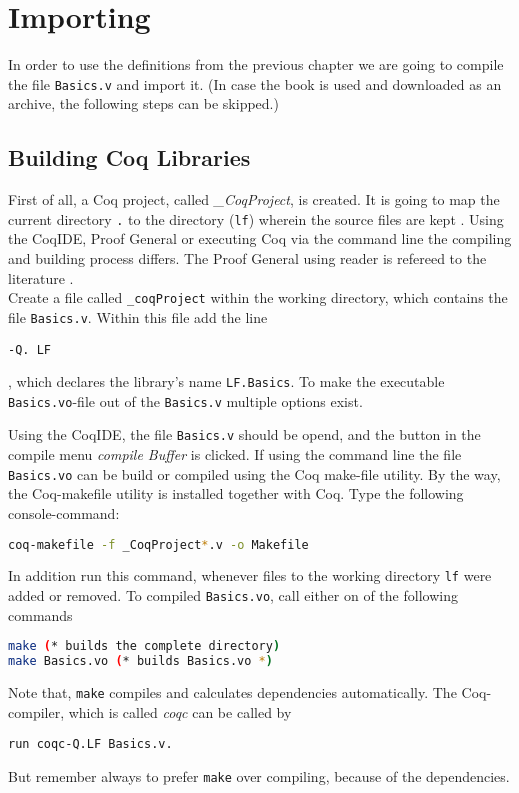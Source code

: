 \section{Importing}


In order to use the definitions from the previous chapter we are going to compile the file 
\texttt{Basics.v} and import it.
(In case the book \cite{PACGGHSY} is used and downloaded as an archive, the following steps can be skipped.)   

\subsection{Building Coq Libraries}

First of all, a Coq project, called {\itshape \_CoqProject}, is created.  
It is going to map the current directory \texttt{.} to the directory (\texttt{lf}) wherein the source files are kept .
Using the CoqIDE, Proof General or executing Coq via the command line the compiling and building process differs.
The Proof General using reader is refereed to the literature \cite[chp. Induction, Proof by Induction]{PACGGHSY}.\\

Create a file called \texttt{\_coqProject} within the working directory, which contains the file \texttt{Basics.v}.
Within this file add the line 

\begin{lstlisting}
-Q. LF
\end{lstlisting}

, which declares the library's name \texttt{LF.Basics}. 
To make the executable \texttt{Basics.vo}-file out of the \texttt{Basics.v} multiple options exist.

Using the CoqIDE, the file \texttt{Basics.v} should be opend, and the button in the compile menu {\itshape compile Buffer} is clicked.
If using the command line the file \texttt{Basics.vo} can be build or compiled using the Coq  make-file utility.
By the way, the Coq-makefile utility is installed together with Coq.
Type the following console-command:
\begin{lstlisting}[language=bash]
coq-makefile -f _CoqProject*.v -o Makefile
\end{lstlisting}

In addition run this command, whenever files to the working directory \texttt{lf} were added or removed.
To compiled \texttt{Basics.vo}, call either on of the following commands 
\begin{lstlisting}[language=bash]
make (* builds the complete directory)
make Basics.vo (* builds Basics.vo *)
\end{lstlisting}
Note that, \lstinline!make! compiles and calculates dependencies automatically. 
The Coq-compiler, which is called {\itshape coqc} can be called by 
\begin{lstlisting}
run coqc-Q.LF Basics.v.
\end{lstlisting}
But remember always to prefer \texttt{make} over compiling, because of the dependencies.\\
 
